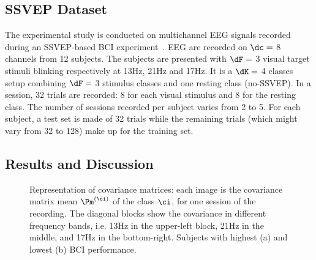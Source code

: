 \subsection{SSVEP Dataset}
The experimental study is conducted on multichannel EEG signals recorded during an SSVEP-based BCI experiment~\cite{kalunga_hybrid_2014}.   
EEG are recorded on $\dc=$ 8 channels from 12 subjects.
The subjects are presented with $\dF=$ 3 visual target stimuli blinking respectively at 13Hz, 21Hz and 17Hz. %
It is a $\dK=$ 4 classes setup combining $\dF=$ 3 stimulus classes and one resting class (no-SSVEP).
In a session, 32 trials are recorded: 8 for each visual stimulus and 8 for the resting class. 
The number of sessions recorded per subject varies from 2 to 5.
For each subject, a test set is made of 32 trials while the remaining trials (which might vary from 32 to 128) make up for the training set.

\subsection{Results and Discussion}

\begin{figure}[h!]
\centering
{}
\caption{Representation of covariance matrices: each image is the covariance matrix mean $\Pm^{(\ci)}$ of the class $\ci$, for one session of the recording. The diagonal blocks show the covariance in different frequency bands, i.e. 13Hz in the upper-left block, 21Hz in the middle, and 17Hz in the bottom-right. Subjects with highest (a) and lowest (b) BCI performance. 
}
\label{fig:covmat}
\end{figure}

